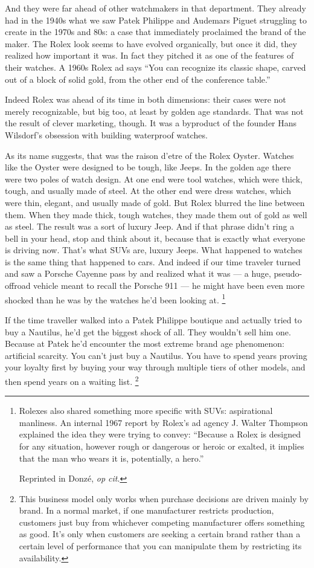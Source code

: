 And they were far ahead of other watchmakers in that department. They
already had in the 1940s what we saw Patek Philippe and Audemars Piguet
struggling to create in the 1970s and 80s: a case that immediately
proclaimed the brand of the maker. The Rolex look seems to have evolved
organically, but once it did, they realized how important it was. In
fact they pitched it as one of the features of their watches. A 1960s
Rolex ad says ``You can recognize its classic shape, carved out of a
block of solid gold, from the other end of the conference table.''

Indeed Rolex was ahead of its time in both dimensions: their cases were
not merely recognizable, but big too, at least by golden age standards.
That was not the result of clever marketing, though. It was a byproduct
of the founder Hans Wilsdorf's obsession with building waterproof
watches.

As its name suggests, that was the raison d'etre of the Rolex Oyster.
Watches like the Oyster were designed to be tough, like Jeeps. In the
golden age there were two poles of watch design. At one end were tool
watches, which were thick, tough, and usually made of steel. At the
other end were dress watches, which were thin, elegant, and usually made
of gold. But Rolex blurred the line between them. When they made thick,
tough watches, they made them out of gold as well as steel. The result
was a sort of luxury Jeep. And if that phrase didn't ring a bell in your
head, stop and think about it, because that is exactly what everyone is
driving now. That's what SUVs are, luxury Jeeps. What happened to
watches is the same thing that happened to cars. And indeed if our time
traveler turned and saw a Porsche Cayenne pass by and realized what it
was --- a huge, pseudo-offroad vehicle meant to recall the Porsche 911
--- he might have been even more shocked than he was by the watches he'd
been looking at. \footnote{Rolexes also shared something more specific with SUVs:
aspirational manliness. An internal 1967 report by Rolex's ad agency J.
Walter Thompson explained the idea they were trying to convey: ``Because
a Rolex is designed for any situation, however rough or dangerous or
heroic or exalted, it implies that the man who wears it is, potentially,
a hero.''

Reprinted in Donzé, \emph{op cit}.}

If the time traveller walked into a Patek Philippe boutique and actually
tried to buy a Nautilus, he'd get the biggest shock of all. They
wouldn't sell him one. Because at Patek he'd encounter the most extreme
brand age phenomenon: artificial scarcity. You can't just buy a
Nautilus. You have to spend years proving your loyalty first by buying
your way through multiple tiers of other models, and then spend years on
a waiting list. \footnote{This business model only works when purchase decisions are
driven mainly by brand. In a normal market, if one manufacturer
restricts production, customers just buy from whichever competing
manufacturer offers something as good. It's only when customers are
seeking a certain brand rather than a certain level of performance that
you can manipulate them by restricting its availability.}

